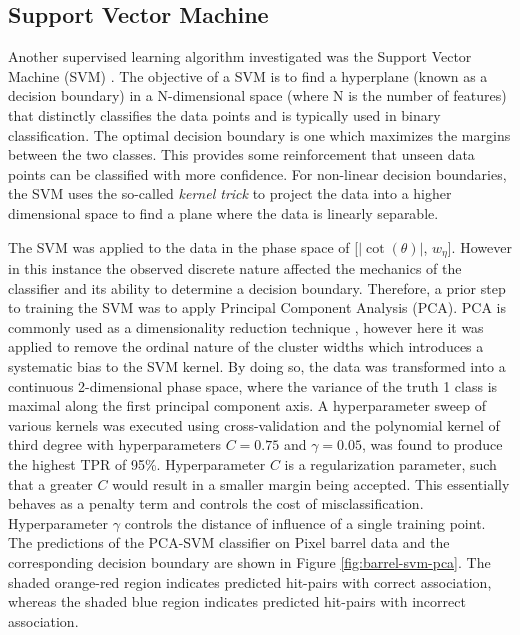 \subsection{Support Vector Machine}


Another supervised learning algorithm investigated was the Support Vector Machine (SVM) \cite{svm}. The objective of a SVM is to find a hyperplane (known as a decision boundary) in a N-dimensional space (where N is the number of features) that distinctly classifies the data points and is typically used in binary classification. The optimal decision boundary is one which maximizes the margins between the two classes. This provides some reinforcement that unseen data points can be classified with more confidence. For non-linear decision boundaries, the SVM uses the so-called \textit{kernel trick} to project the data into a higher dimensional space to find a plane where the data is linearly separable. 

The SVM was applied to the data in the phase space of  [$|\cot(\theta)|$, $w_{\eta}$]. However in this instance the observed discrete nature affected the mechanics of the classifier and its ability to determine a decision boundary. Therefore, a prior step to training the SVM was to apply Principal Component Analysis (PCA). PCA is commonly used as a dimensionality reduction technique \cite{pca}, however here it was applied to remove the ordinal nature of the cluster widths which introduces a systematic bias to the SVM kernel. By doing so, the data was transformed into a continuous 2-dimensional phase space, where the variance of the truth 1 class is maximal along the first principal component axis. A hyperparameter sweep of various kernels was executed using cross-validation and the polynomial kernel of third degree with hyperparameters $C=0.75$ and $\gamma=0.05$, was found to produce the highest TPR of 95\%. Hyperparameter $C$ is a regularization parameter, such that a greater $C$ would result in a smaller margin being accepted. This essentially behaves as a penalty term and controls the cost of misclassification. Hyperparameter $\gamma$ controls the distance of influence of a single training point. The predictions of the PCA-SVM classifier on Pixel barrel data and the corresponding decision boundary are shown in Figure \ref{fig:barrel-svm-pca}. The shaded orange-red region indicates predicted hit-pairs with correct association, whereas the shaded blue region indicates predicted hit-pairs with incorrect association.

